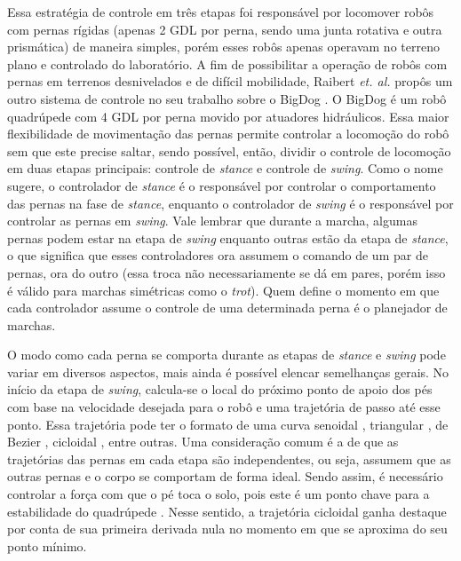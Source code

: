 \documentclass[../main.tex]{subfiles}
\begin{document}
Essa estratégia de controle em três etapas foi responsável por locomover robôs com pernas rígidas (apenas 2 GDL por perna, sendo uma junta rotativa e outra prismática) de maneira simples, porém esses robôs apenas operavam no terreno plano e controlado do laboratório. A fim de possibilitar a operação de robôs com pernas em terrenos desnivelados e de difícil mobilidade, Raibert \textit{et. al.} propôs um outro sistema de controle no seu trabalho sobre o BigDog \cite{RAIBERT200810822}. O BigDog é um robô quadrúpede com 4 GDL por perna movido por atuadores hidráulicos. Essa maior flexibilidade de movimentação das pernas permite controlar a locomoção do robô sem que este precise saltar, sendo possível, então, dividir o controle de locomoção em duas etapas principais: controle de \textit{stance} e controle de \textit{swing}. Como o nome sugere, o controlador de \textit{stance} é o responsável por controlar o comportamento das pernas na fase de \textit{stance}, enquanto o controlador de \textit{swing} é o responsável por controlar as pernas em \textit{swing}. Vale lembrar que durante a marcha, algumas pernas podem estar na etapa de \textit{swing} enquanto outras estão da etapa de \textit{stance}, o que significa que esses controladores ora assumem o comando de um par de pernas, ora do outro (essa troca não necessariamente se dá em pares, porém isso é válido para marchas simétricas como o \textit{trot}). Quem define o momento em que cada controlador assume o controle de uma determinada perna é o planejador de marchas.

O modo como cada perna se comporta durante as etapas de \textit{stance} e \textit{swing} pode variar em diversos aspectos, mais ainda é possível elencar semelhanças gerais. No início da etapa de \textit{swing}, calcula-se o local do próximo ponto de apoio dos pés com base na velocidade desejada para o robô e uma trajetória de passo até esse ponto. Essa trajetória pode ter o formato de uma curva senoidal \cite{X.118}, triangular \cite{StanfordPupper}, de Bezier \cite{HackadayQuadruped}, cicloidal \cite{Shi2021} \cite{X.58}, entre outras. Uma consideração comum é a de que as trajetórias das pernas em cada etapa são independentes, ou seja, assumem que as outras pernas e o corpo se comportam de forma ideal. Sendo assim, é necessário controlar a força com que o pé toca o solo, pois este é um ponto chave para a estabilidade do quadrúpede \cite{X.118}. Nesse sentido, a trajetória cicloidal ganha destaque por conta de sua primeira derivada nula no momento em que se aproxima do seu ponto mínimo.
\end{document}

